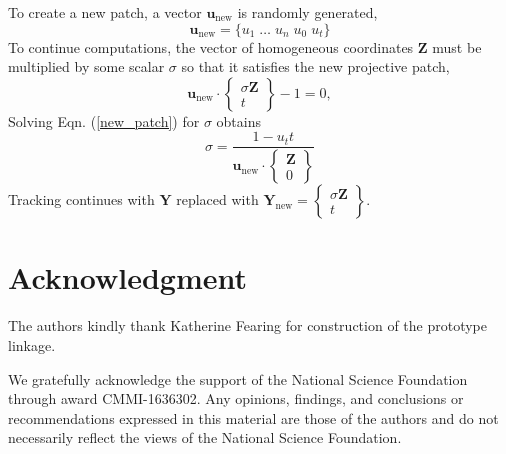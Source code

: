 \documentclass[journal]{IEEEtran}
\begin{document}
To create a new patch, a vector $\mathbf{u}_\text{new}$ is randomly generated,
\begin{equation}
\mathbf{u}_\text{new} = \{ u_1 \; \ldots \; u_n \; u_0 \; u_t \}
\end{equation}
To continue computations, the vector of homogeneous coordinates $\mathbf{Z}$ must be multiplied by some scalar $\sigma$ so that it satisfies the new projective patch,
\begin{equation}
\mathbf{u}_\text{new} \cdot \begin{Bmatrix} \sigma\mathbf{Z} \\ t \end{Bmatrix}  - 1 = 0,
\label{new_patch}
\end{equation}
Solving Eqn. (\ref{new_patch}) for $\sigma$ obtains
\begin{equation}
\sigma = \frac{1 - u_t t}{\mathbf{u}_\text{new} \cdot \begin{Bmatrix} \mathbf{Z} \\ 0 \end{Bmatrix}}
\end{equation}
Tracking continues with $\mathbf{Y}$ replaced with $\mathbf{Y}_\text{new} = \begin{Bmatrix} \sigma\mathbf{Z} \\ t \end{Bmatrix}$.






\section*{Acknowledgment}

The authors kindly thank Katherine Fearing for construction of the prototype linkage.

We gratefully acknowledge the support of the National Science Foundation through award CMMI-1636302.  Any opinions, findings, and conclusions or recommendations expressed in this material are those of the authors and do not necessarily reflect the views of the National Science Foundation.


\ifCLASSOPTIONcaptionsoff
  \newpage
\fi







% 
\end{document}
